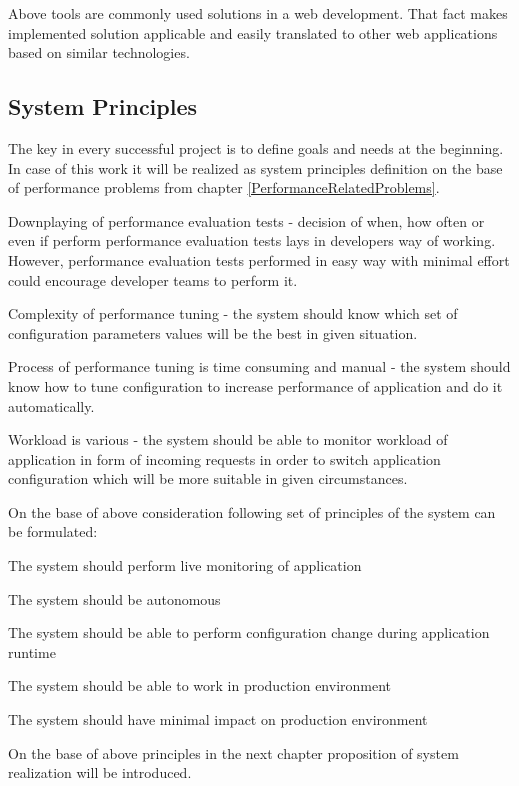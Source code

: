 \documentclass[10pt,a4paper]{article}
\let\tempone\itemize
\let\temptwo\enditemize
\renewenvironment{itemize}{\tempone\addtolength{\itemsep}{-0.4\baselineskip}}{\temptwo}
\begin{document}
Above tools are commonly used solutions in a web development. That fact makes implemented solution applicable and easily translated to other web applications based on similar technologies.  

\subsection{System Principles} \label{principles}
The key in every successful project is to define goals and needs at the beginning.
In case of this work it will be realized as system principles definition on the base of  performance problems from chapter \ref{PerformanceRelatedProblems}.

Downplaying of performance evaluation tests - decision of when, how often or even if perform performance evaluation tests lays in developers way of working. However, performance evaluation tests performed in easy way with minimal effort could encourage developer teams to perform it. 

Complexity of performance tuning - the system should know which set of configuration parameters values will be the best in given situation.  

Process of performance tuning is time consuming and manual - the system should know how to tune configuration to increase performance of application and do it automatically. 

Workload is various - the system should be able to monitor workload of application in form of incoming requests in order to switch application configuration which will be more suitable in given circumstances. 

On the base of above consideration following set of principles of the system can be formulated:

\begin{itemize}
\item The system should perform live monitoring of application
\item The system should be autonomous
\item The system should be able to perform configuration change during application runtime
\item The system should be able to work in production environment
\item The system should have minimal impact on production environment
\end{itemize}

On the base of above principles in the next chapter proposition of system realization will be introduced.  
\end{document}
